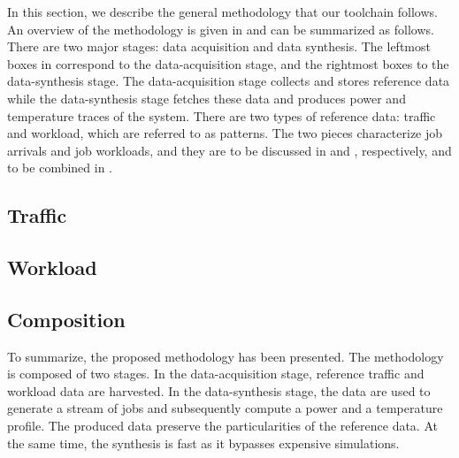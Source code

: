 In this section, we describe the general methodology that our toolchain follows.
An overview of the methodology is given in  and can be
summarized as follows. There are two major stages: data acquisition and data
synthesis. The leftmost boxes in  correspond to the
data-acquisition stage, and the rightmost boxes to the data-synthesis stage. The
data-acquisition stage collects and stores reference data while the
data-synthesis stage fetches these data and produces power and temperature
traces of the system. There are two types of reference data: traffic and
workload, which are referred to as patterns. The two pieces characterize job
arrivals and job workloads, and they are to be discussed in  and
, respectively, and to be combined in .

\subsection{Traffic} 


\subsection{Workload} 


\subsection{Composition} 


To summarize, the proposed methodology has been presented. The methodology is
composed of two stages. In the data-acquisition stage, reference traffic and
workload data are harvested. In the data-synthesis stage, the data are used to
generate a stream of jobs and subsequently compute a power and a temperature
profile. The produced data preserve the particularities of the reference data.
At the same time, the synthesis is fast as it bypasses expensive simulations.
